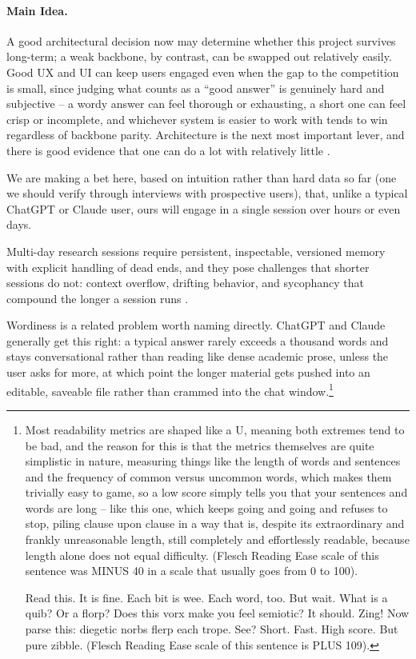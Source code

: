 \paragraph{Main Idea.}
A good architectural decision now may determine whether this project survives long-term; a weak backbone, by contrast, can be swapped out relatively easily. Good UX and UI can keep users engaged even when the gap to the competition is small, since judging what counts as a ``good answer'' is genuinely hard and subjective -- a wordy answer can feel thorough or exhausting, a short one can feel crisp or incomplete, and whichever system is easier to work with tends to win regardless of backbone parity. Architecture is the next most important lever, and there is good evidence that one can do a lot with relatively little \cite{2602.24273}.

We are making a bet here, based on intuition rather than hard data so far (one we should verify through interviews with prospective users), that, unlike a typical ChatGPT or Claude user, ours will engage in a single session over hours or even days.

Multi-day research sessions require persistent, inspectable, versioned memory with explicit handling of dead ends, and they pose challenges that shorter sessions do not: context overflow, drifting behavior, and sycophancy that compound the longer a session runs \cite{Jain2026}.

Wordiness is a related problem worth naming directly. ChatGPT and Claude generally get this right: a typical answer rarely exceeds a thousand words and stays conversational rather than reading like dense academic prose, unless the user asks for more, at which point the longer material gets pushed into an editable, saveable file rather than crammed into the chat window.\footnote{
    Most readability metrics are shaped like a U, meaning both extremes tend to be bad, and the reason for this is that the metrics themselves are quite simplistic in nature, measuring things like the length of words and sentences and the frequency of common versus uncommon words, which makes them trivially easy to game, so a low score simply tells you that your sentences and words are long -- like this one, which keeps going and going and refuses to stop, piling clause upon clause in a way that is, despite its extraordinary and frankly unreasonable length, still completely and effortlessly readable, because length alone does not equal difficulty.
    (Flesch Reading Ease scale of this sentence was MINUS 40 in a scale that usually goes from 0 to 100).

    Read this. It is fine. Each bit is wee. Each word, too. But wait. What is a quib? Or a florp? Does this vorx make you feel semiotic? It should. Zing! Now parse this: diegetic norbs flerp each trope. See? Short. Fast. High score. But pure zibble.
    (Flesch Reading Ease scale of this sentence is PLUS 109).
}

